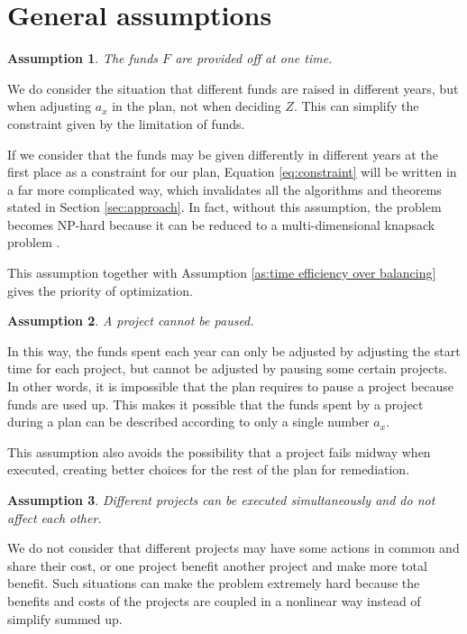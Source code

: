 \documentclass{article}
\newtheorem{assumption}{Assumption}
\begin{document}
\section{General assumptions}
\label{sec:assumptions}

\begin{assumption}
\label{as:funds at one time}
The funds $F$ are provided off at one time.
\end{assumption}

We do consider the situation that different funds are raised in different years,
but when adjusting $a_x$ in the plan, not when deciding $Z$.
This can simplify the constraint given by the limitation of funds.

If we consider that the funds may be given differently in different years at the first place as a constraint for our plan,
Equation \ref{eq:constraint} will be written in a far more complicated way, which invalidates all the algorithms and theorems stated in Section \ref{sec:approach}.
In fact, without this assumption, the problem becomes NP-hard because it can be reduced to a multi-dimensional knapsack problem \cite{2dknapsacknp}.

This assumption together with Assumption \ref{as:time efficiency over balancing} gives the priority of optimization.

\begin{assumption}
\label{as:no pause}
A project cannot be paused.
\end{assumption}

In this way, the funds spent each year can only be adjusted by adjusting the start time for each project,
but cannot be adjusted by pausing some certain projects.
In other words, it is impossible that the plan requires to pause a project because funds are used up.
This makes it possible that the funds spent by a project during a plan can be described according to only a single number $a_x$.

This assumption also avoids the possibility that a project fails midway when executed, creating better choices for the rest of the plan for remediation.

\begin{assumption}
\label{as:no interrelationship}
Different projects can be executed simultaneously and do not affect each other.
\end{assumption}

We do not consider that different projects may have some actions in common and share their cost, or one project benefit another project and make more total benefit.
Such situations can make the problem extremely hard because the benefits and costs of the projects are coupled in a nonlinear way instead of simplify summed up.
\end{document}
